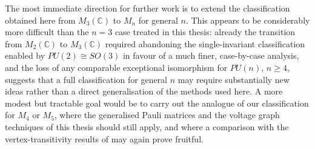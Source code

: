 The most immediate direction for further work is to extend the
classification obtained here from \( M_3 (\mathbb{C}) \) to \( M_n \)
for general
\( n \). This appears to be considerably more difficult than the
\( n=3 \) case treated in this thesis: already the transition from
\( M_2 (\mathbb{C}) \) to \( M_3 (\mathbb{C}) \) required abandoning
the single-invariant
classification enabled by \( PU(2)\cong SO(3) \) in favour of a much
finer, case-by-case analysis, and the loss of any comparable
exceptional isomorphism for \( PU(n) \), \( n \geq 4 \), suggests that
a full classification for general \( n \) may require substantially
new ideas rather than a direct generalisation of the methods used
here. A more modest but tractable goal would be to carry out the
analogue of our classification for \( M_4 \) or \( M_5 \), where the
generalised Pauli matrices and the voltage graph techniques of this
thesis should still apply, and where a comparison with the
vertex-transitivity results of \textcite{hayes26} may again prove
fruitful.

